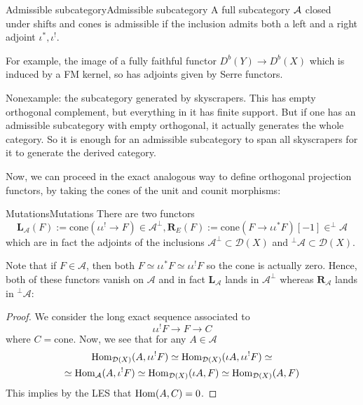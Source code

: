 \begin{definition}{Admissible subcategory}{Admissible subcategory}
    A full subcategory $\mathcal{A}$ closed under shifts and cones is admissible if the inclusion admits both a left and a right adjoint $\iota^*, \iota^!$. 
\end{definition}

For example, the image of a fully faithful functor $D^b(Y)\to D^b(X)$ which is induced by a FM kernel, so has adjoints given by Serre functors.

Nonexample: the subcategory generated by skyscrapers. This has empty orthogonal complement, but everything in it has finite support. But if one has an admissible subcategory with empty orthogonal, it actually generates the whole category. So it is enough for an admissible subcategory to span all skyscrapers for it to generate the derived category.

Now, we can proceed in the exact analogous way to define orthogonal projection functors, by taking the cones of the unit and counit morphisms:

\begin{definition}{Mutations}{Mutations}
    There are two functors
    $$\mathbf{L}_\mathcal{A}(F):=\mathrm{cone}(\iota\iota^! \rightarrow F)\in \mathcal{A}^\perp, \mathbf{R}_E(F):=\mathrm{cone}(F\rightarrow \iota\iota^* F )[-1]\in ^\perp\mathcal{A}$$
    which are in fact the adjoints of the inclusions $\mathcal{A}^\perp \subset \mathcal{D}(X)$ and $^\perp\mathcal{A}\subset \mathcal{D}(X)$.
\end{definition}
Note that if $F\in \mathcal{A}$, then both $F\simeq \iota\iota^* F \simeq \iota\iota^! F$ so the cone is actually zero. Hence, both of these functors vanish on $\mathcal{A}$ and in fact $\mathbf{L}_\mathcal{A}$ lands in $\mathcal{A}^\perp$ whereas $\mathbf{R}_\mathcal{A}$ lands in $^\perp\mathcal{A}$:
\begin{proof}
    We consider the long exact sequence associated to $$\iota\iota^! F \rightarrow F \rightarrow C$$where $C=\mathrm{cone}$. Now, we see that for any $A\in \mathcal{A}$ \begin{gather*}
    \operatorname{Hom}_{\mathcal{D}(X)}(A, \iota\iota^!F)\simeq \operatorname{Hom}_{\mathcal{D}(X)}(\iota A, \iota\iota^!F)\simeq\\
    \simeq\operatorname{Hom}_\mathcal{A}(A, \iota^!F)\simeq \operatorname{Hom}_{\mathcal{D}(X)}(\iota A, F)\simeq\operatorname{Hom}_{\mathcal{D}(X)}(A, F)
    \end{gather*}
    This implies by the LES that $\operatorname{Hom}(A,C)=0$.
\end{proof}



